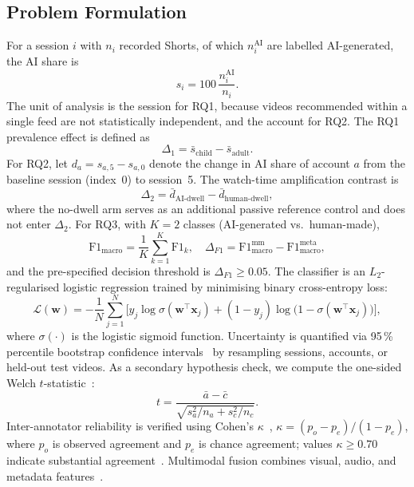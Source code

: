 \documentclass[conference]{IEEEtran}
\begin{document}
\subsection{Problem Formulation}\label{sec:formal}
For a session $i$ with $n_i$ recorded Shorts, of which $n_i^{\text{AI}}$ are labelled AI-generated, the AI share is
\begin{equation}
  s_i = 100\,\frac{n_i^{\text{AI}}}{n_i}.
  \label{eq:share}
\end{equation}
The unit of analysis is the session for RQ1, because videos recommended within a single feed are not statistically independent, and the account for RQ2. The RQ1 prevalence effect is defined as
\begin{equation}
  \Delta_1 = \bar{s}_{\text{child}} - \bar{s}_{\text{adult}}.
  \label{eq:rq1}
\end{equation}
For RQ2, let $d_a = s_{a,5} - s_{a,0}$ denote the change in AI share of account $a$ from the baseline session (index~0) to session~5. The watch-time amplification contrast is
\begin{equation}
  \Delta_2 = \bar{d}_{\text{AI-dwell}} - \bar{d}_{\text{human-dwell}},
  \label{eq:rq2}
\end{equation}
where the no-dwell arm serves as an additional passive reference control and does not enter $\Delta_2$. For RQ3, with $K=2$ classes (AI-generated vs.\ human-made),
\begin{equation}
  \text{F1}_{\text{macro}} = \frac{1}{K}\sum_{k=1}^{K}\text{F1}_k, \quad
  \Delta_{F1} = \text{F1}^{\text{mm}}_{\text{macro}} - \text{F1}^{\text{meta}}_{\text{macro}},
  \label{eq:f1}
\end{equation}
and the pre-specified decision threshold is $\Delta_{F1}\ge 0.05$. The classifier is an $L_2$-regularised logistic regression trained by minimising binary cross-entropy loss:
\begin{equation}
  \mathcal{L}(\mathbf{w}) = -\frac{1}{N}\sum_{j=1}^{N}\bigl[y_j\log\sigma(\mathbf{w}^{\top}\mathbf{x}_j) + (1-y_j)\log\bigl(1-\sigma(\mathbf{w}^{\top}\mathbf{x}_j)\bigr)\bigr],
  \label{eq:loss}
\end{equation}
where $\sigma(\cdot)$ is the logistic sigmoid function. Uncertainty is quantified via 95\,\% percentile bootstrap confidence intervals~\cite{efron1993} by resampling sessions, accounts, or held-out test videos. As a secondary hypothesis check, we compute the one-sided Welch $t$-statistic~\cite{welch1947}:
\begin{equation}
  t = \frac{\bar{a}-\bar{c}}{\sqrt{s_a^2/n_a + s_c^2/n_c}}.
  \label{eq:welch}
\end{equation}
Inter-annotator reliability is verified using Cohen's $\kappa$~\cite{cohen1960}, $\kappa=(p_o-p_e)/(1-p_e)$, where $p_o$ is observed agreement and $p_e$ is chance agreement; values $\kappa\ge 0.70$ indicate substantial agreement~\cite{landis1977}. Multimodal fusion combines visual, audio, and metadata features~\cite{baltrusaitis2019}.
\end{document}
